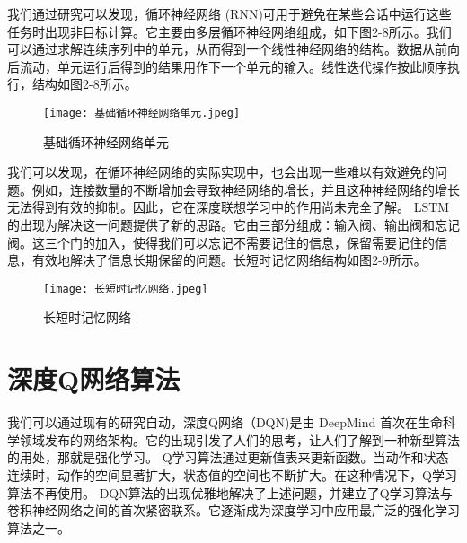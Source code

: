
我们通过研究可以发现，循环神经网络 (RNN)\cite{zaremba2014recurrent}可用于避免在某些会话中运行这些任务时出现非目标计算。它主要由多层循环神经网络组成，如下图2-8所示。我们可以通过求解连续序列中的单元，从而得到一个线性神经网络的结构。数据从前向后流动，单元运行后得到的结果用作下一个单元的输入。线性迭代操作按此顺序执行，结构如图2-8所示。

\begin{figure}[hbt]
	\centering
	\texttt{[image: 基础循环神经网络单元.jpeg]}
	\caption{基础循环神经网络单元}
	\label{f.example}
\end{figure}

我们可以发现，在循环神经网络的实际实现中，也会出现一些难以有效避免的问题。例如，连接数量的不断增加会导致神经网络的增长，并且这种神经网络的增长无法得到有效的抑制。因此，它在深度联想学习中的作用尚未完全了解。 LSTM\cite{hochreiter1997long}的出现为解决这一问题提供了新的思路。它由三部分组成：输入阀、输出阀和忘记阀。这三个门的加入，使得我们可以忘记不需要记住的信息，保留需要记住的信息，有效地解决了信息长期保留的问题。长短时记忆网络结构如图2-9所示。

\begin{figure}[hbt]
	\centering
	\texttt{[image: 长短时记忆网络.jpeg]}
	\caption{长短时记忆网络}
	\label{f.example}
\end{figure}


\section{深度Q网络算法 }


我们可以通过现有的研究自动，深度Q网络（DQN)\cite{mnih2015human}是由 DeepMind 首次在生命科学领域发布的网络架构。它的出现引发了人们的思考，让人们了解到一种新型算法的用处，那就是强化学习。 Q学习算法通过更新值表来更新函数。当动作和状态连续时，动作的空间显著扩大，状态值的空间也不断扩大。在这种情况下，Q学习算法不再使用。 DQN算法的出现优雅地解决了上述问题，并建立了Q学习算法与卷积神经网络之间的首次紧密联系。它逐渐成为深度学习中应用最广泛的强化学习算法之一。


